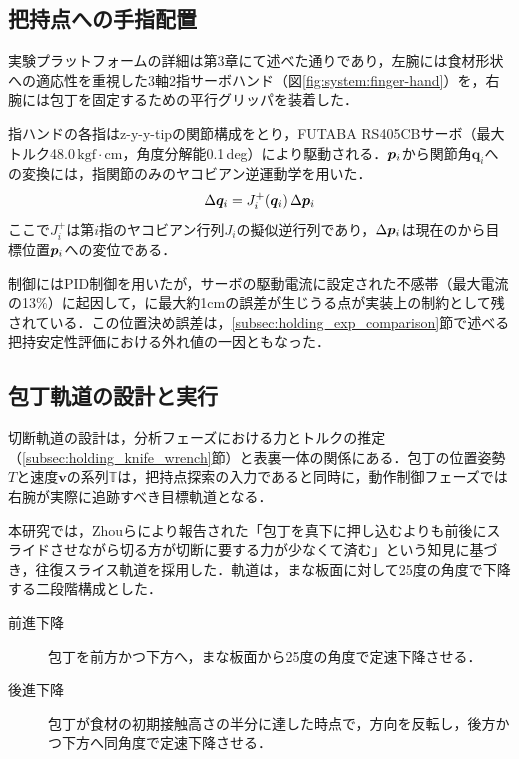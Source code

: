 \subsection{把持点への手指配置}
\label{subsec:holding_finger_placement}

実験プラットフォームの詳細は第3章にて述べた通りであり，左腕には食材形状への適応性を重視した3軸2指サーボハンド（図\ref{fig:system:finger-hand}）を，右腕には包丁を固定するための平行グリッパを装着した．

指ハンドの各指はz-y-y-tipの関節構成をとり，FUTABA RS405CBサーボ（最大トルク48.0\,$\mathrm{kgf \cdot cm}$，角度分解能0.1\,deg）により駆動される．{\namefingerpoint}$\equfingerpoint[][i]$から関節角$\bm{q}_i$への変換には，指関節のみのヤコビアン逆運動学を用いた．
\begin{equation}
\Delta\bm{q}_i = J_i^{+}(\bm{q}_i)\, \Delta\equfingerpoint[][i]
\end{equation}
ここで$J_i^{+}$は第$i$指のヤコビアン行列$J_i$の擬似逆行列であり，$\Delta\equfingerpoint[][i]$は現在の{\namefingerpoint}から目標位置$\equfingerpoint[][i]$への変位である．

{\namefingerpoint}制御にはPID制御を用いたが，サーボの駆動電流に設定された不感帯（最大電流の13\%）に起因して，{\namefingerpoint}に最大約1cmの誤差が生じうる点が実装上の制約として残されている．この位置決め誤差は，\ref{subsec:holding_exp_comparison}節で述べる把持安定性評価における外れ値の一因ともなった．


\subsection{包丁軌道の設計と実行}
\label{subsec:holding_knife_trajectory}

切断軌道の設計は，分析フェーズにおける力とトルクの推定（\ref{subsec:holding_knife_wrench}節）と表裏一体の関係にある．包丁の位置姿勢$T$と速度$\bm{v}$の系列$\mathbb{T}$は，把持点探索の入力であると同時に，動作制御フェーズでは右腕が実際に追跡すべき目標軌道となる．

本研究では，Zhouら\cite{Cutting-Slice-1,Cutting-Slice-2}により報告された「包丁を真下に押し込むよりも前後にスライドさせながら切る方が切断に要する力が少なくて済む」という知見に基づき，往復スライス軌道を採用した．軌道は，まな板面に対して25度の角度で下降する二段階構成とした．

\begin{description}
    \item[前進下降] 包丁を前方かつ下方へ，まな板面から25度の角度で定速下降させる．
    \item[後進下降] 包丁が食材の初期接触高さの半分に達した時点で，方向を反転し，後方かつ下方へ同角度で定速下降させる．
\end{description}

